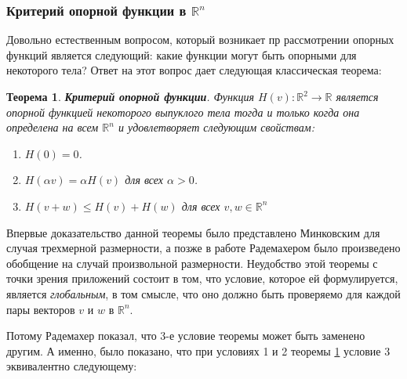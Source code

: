 \documentclass[a4paper, 12pt, titlepage]{article}
\theoremstyle{definition}
\theoremstyle{plain}
\newtheorem{SmartTheorem}{Теорема}
\theoremstyle{plain}
\begin{document}
\subsubsection{Критерий опорной функции в $\mathbb{R}^{n}$}
\label{sec:support-methods:3d-nonuniform:continous-criterion}

Довольно естественным вопросом, который возникает пр рассмотрении опорных
функций является следующий: какие функции могут быть опорными для некоторого
тела? Ответ на этот вопрос дает следующая классическая теорема:

\begin{SmartTheorem}
 \label{thm:support-function-criterio-R2}
 \textbf{Критерий опорной функции}.
 Функция $H(v): \mathbb{R}^{2} \to \mathbb{R}$ является опорной функцией
 некоторого выпуклого тела тогда и только когда она определена на всем
 $\mathbb{R}^{n}$ и удовлетворяет следующим свойствам:
 \begin{enumerate}
  \item $H(0) = 0$.
  \item $H(\alpha v) = \alpha H(v)$ для всех $\alpha > 0$.
  \item $H(v + w) \leq H(v) + H(w)$ для всех $v, w \in \mathbb{R}^{n}$
 \end{enumerate}
\end{SmartTheorem}

Впервые доказательство данной теоремы было представлено Минковским для случая
трехмерной размерности, а позже в работе \cite{journals/mz/Rademacher22}
Радемахером было произведено обобщение на случай произвольной размерности.
Неудобство этой теоремы с точки зрения приложений состоит в том, что условие,
которое ей формулируется, является \textit{глобальным}, в том смысле, что оно
должно быть проверяемо для каждой пары векторов $v$ и $w$ в $\mathbb{R}^{n}$.

Потому Радемахер показал, что 3-е условие теоремы может быть заменено другим.
А именно, было показано, что при условиях 1 и 2 теоремы
\ref{thm:support-function-criterio-R2} условие 3 эквивалентно следующему:
\end{document}
